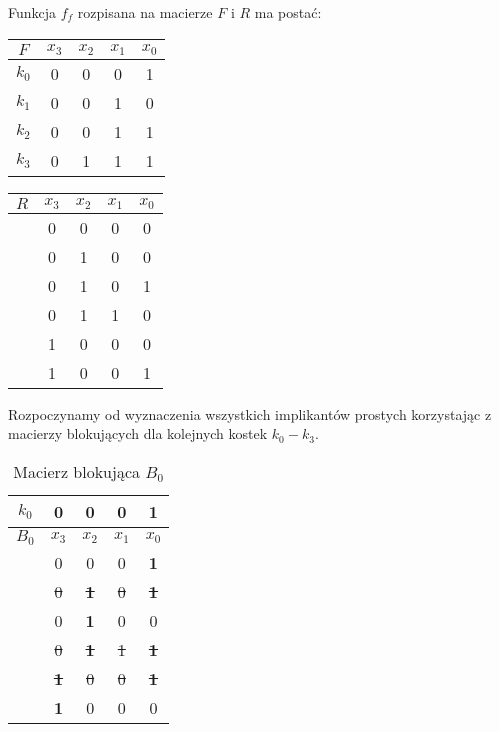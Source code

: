 \setcounter{implicant_counter}{0}

Funkcja $f_f$ rozpisana na macierze $F$ i $R$ ma postać:
\begin{center}
    \begin{tabular}[t]{ |c|c c c c| }
        \hline
        $F$ & $x_3$ & $x_2$ & $x_1$ & $x_0$ \\
        \hline
        $k_0$ & 0 & 0 & 0 & 1 \\
        $k_1$ & 0 & 0 & 1 & 0 \\
        $k_2$ & 0 & 0 & 1 & 1 \\
        $k_3$ & 0 & 1 & 1 & 1 \\
        \hline
    \end{tabular}
    \hspace{1cm}
    \begin{tabular}[t]{ |c|c c c c| }
        \hline
        $R$ & $x_3$ & $x_2$ & $x_1$ & $x_0$ \\
        \hline
        & 0 & 0 & 0 & 0 \\
        & 0 & 1 & 0 & 0 \\
        & 0 & 1 & 0 & 1 \\
        & 0 & 1 & 1 & 0 \\
        & 1 & 0 & 0 & 0 \\
        & 1 & 0 & 0 & 1 \\
        \hline
    \end{tabular}
\end{center}

Rozpoczynamy od wyznaczenia wszystkich implikantów prostych korzystając z macierzy blokujących dla kolejnych kostek
$k_0-k_3$.

\begin{table}[H]
    \centering
    \begin{tabular}[t]{ |c|c c c c| }
        \hline
        $k_0$ & 0 & 0 & 0 & 1 \\
        \hline\hline
        $B_0$ & $x_3$ & $x_2$ & $x_1$ & $x_0$ \\
        \hline
        & 0 & 0 & 0 & \textbf{1} \\
        & \sout{0} & \sout{\textbf{1}} & \sout{0} & \sout{\textbf{1}} \\
        & 0 & \textbf{1} & 0 & 0 \\
        & \sout{0} & \sout{\textbf{1}} & \sout{1} & \sout{\textbf{1}} \\
        & \sout{\textbf{1}} & \sout{0} & \sout{0} & \sout{\textbf{1}} \\
        & \textbf{1} & 0 & 0 & 0 \\
        \hline
    \end{tabular}
    \caption{Macierz blokująca $B_0$}\label{tab:b0f}
\end{table}

